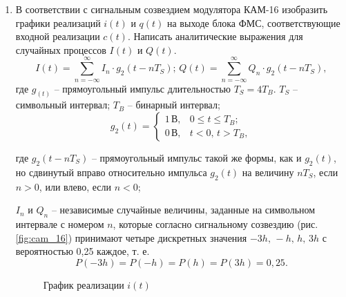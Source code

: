 \documentclass[a4paper, 12pt]{article}
\begin{document}
\begin{enumerate}
  \item В соответствии с сигнальным созвездием модулятора КАМ-16 
  изобразить графики реализаций $i(t)$ и $q(t)$ на выходе 
  блока ФМС, соответствующие входной реализации $c(t)$. 
  Написать аналитические выражения для случайных процессов 
  $I(t)$ и $Q(t)$.
  \begin{equation} \label{eq:ItQt}
    I(t)=\sum^\infty_{n=-\infty}I_n\cdot g_2(t-nT_S);\,
    Q(t)=\sum^\infty_{n=-\infty}Q_n\cdot g_2(t-nT_S),
  \end{equation}
  где $g_(t)$ -- прямоугольный импульс длительностью 
  $T_S=4T_B$. $T_S$ -- символьный интервал; 
  $T_B$ -- бинарный интервал;
  \begin{equation}
    g_2(t)=\begin{cases}
      1\,В, & 0\leq t \leq T_B;\\
      0\,В, & t<0,\,t>T_B,
    \end{cases} 
  \end{equation}

  где $g_2(t-nT_S)$ -- прямоугольный импульс такой же формы, 
  как и $g_2(t)$, но сдвинутый вправо относительно импульса 
  $g_2(t)$ на величину $nT_S$, если $n>0$, или 
  влево, если $n<0$;
  
  $I_n$ и $Q_n$ -- независимые случайные величины, заданные на 
  символьном интервале с номером $n$, 
  которые согласно сигнальному созвездию (рис. \ref{fig:cam_16})
  принимают четыре дискретных значения 
  $-3h,\, -h,\, h,\, 3h$ с вероятностью 0,25 каждое, т. е.
  \begin{equation}
    P(-3h)=P(-h)=P(h)=P(3h)=0,25. 
  \end{equation}


  \begin{figure}[H]
    \centering
    \caption{График реализации $i(t)$}
  \end{figure}


\end{enumerate}
\end{document}
